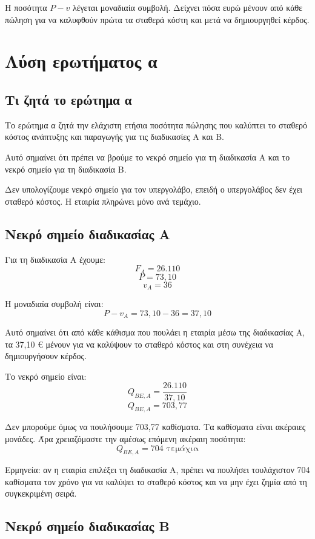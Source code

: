 \documentclass[12pt,a4paper]{article}
\begin{document}
Η ποσότητα \(P-v\) λέγεται μοναδιαία συμβολή. Δείχνει πόσα ευρώ μένουν από κάθε πώληση για να καλυφθούν πρώτα τα σταθερά κόστη και μετά να δημιουργηθεί κέρδος.

\section{Λύση ερωτήματος α}

\subsection{Τι ζητά το ερώτημα α}

Το ερώτημα α ζητά την ελάχιστη ετήσια ποσότητα πώλησης που καλύπτει το σταθερό κόστος ανάπτυξης και παραγωγής για τις διαδικασίες Α και Β.

Αυτό σημαίνει ότι πρέπει να βρούμε το νεκρό σημείο για τη διαδικασία Α και το νεκρό σημείο για τη διαδικασία Β.

Δεν υπολογίζουμε νεκρό σημείο για τον υπεργολάβο, επειδή ο υπεργολάβος δεν έχει σταθερό κόστος. Η εταιρία πληρώνει μόνο ανά τεμάχιο.

\subsection{Νεκρό σημείο διαδικασίας Α}

Για τη διαδικασία Α έχουμε:
\[
F_A=26.110
\]
\[
P=73{,}10
\]
\[
v_A=36
\]

Η μοναδιαία συμβολή είναι:
\[
P-v_A=73{,}10-36=37{,}10
\]

Αυτό σημαίνει ότι από κάθε κάθισμα που πουλάει η εταιρία μέσω της διαδικασίας Α, τα 37,10 € μένουν για να καλύψουν το σταθερό κόστος και στη συνέχεια να δημιουργήσουν κέρδος.

Το νεκρό σημείο είναι:
\[
Q_{BE,A}=\frac{26.110}{37{,}10}
\]
\[
Q_{BE,A}=703{,}77
\]

Δεν μπορούμε όμως να πουλήσουμε 703,77 καθίσματα. Τα καθίσματα είναι ακέραιες μονάδες. Άρα χρειαζόμαστε την αμέσως επόμενη ακέραιη ποσότητα:
\[
\boxed{Q_{BE,A}=704 \text{ τεμάχια}}
\]

Ερμηνεία: αν η εταιρία επιλέξει τη διαδικασία Α, πρέπει να πουλήσει τουλάχιστον 704 καθίσματα τον χρόνο για να καλύψει το σταθερό κόστος και να μην έχει ζημία από τη συγκεκριμένη σειρά.

\subsection{Νεκρό σημείο διαδικασίας Β}
\end{document}
